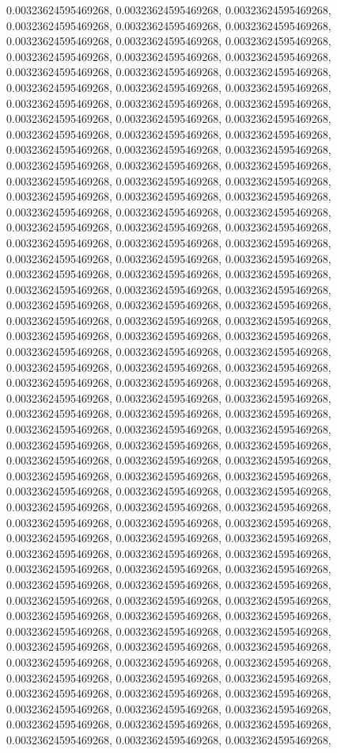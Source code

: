 \documentclass[
  ,man]{apa6}
\begin{document}
0.00323624595469268, 0.00323624595469268, 0.00323624595469268, 0.00323624595469268, 0.00323624595469268, 0.00323624595469268, 0.00323624595469268, 0.00323624595469268, 0.00323624595469268, 0.00323624595469268, 0.00323624595469268, 0.00323624595469268, 0.00323624595469268, 0.00323624595469268, 0.00323624595469268, 0.00323624595469268, 0.00323624595469268, 0.00323624595469268, 0.00323624595469268, 0.00323624595469268, 0.00323624595469268, 0.00323624595469268, 0.00323624595469268, 0.00323624595469268,
0.00323624595469268, 0.00323624595469268, 0.00323624595469268, 0.00323624595469268, 0.00323624595469268, 0.00323624595469268, 0.00323624595469268, 0.00323624595469268, 0.00323624595469268, 0.00323624595469268, 0.00323624595469268, 0.00323624595469268, 0.00323624595469268, 0.00323624595469268, 0.00323624595469268, 0.00323624595469268, 0.00323624595469268, 0.00323624595469268, 0.00323624595469268, 0.00323624595469268, 0.00323624595469268, 0.00323624595469268, 0.00323624595469268, 0.00323624595469268,
0.00323624595469268, 0.00323624595469268, 0.00323624595469268, 0.00323624595469268, 0.00323624595469268, 0.00323624595469268, 0.00323624595469268, 0.00323624595469268, 0.00323624595469268, 0.00323624595469268, 0.00323624595469268, 0.00323624595469268, 0.00323624595469268, 0.00323624595469268, 0.00323624595469268, 0.00323624595469268, 0.00323624595469268, 0.00323624595469268, 0.00323624595469268, 0.00323624595469268, 0.00323624595469268, 0.00323624595469268, 0.00323624595469268, 0.00323624595469268,
0.00323624595469268, 0.00323624595469268, 0.00323624595469268, 0.00323624595469268, 0.00323624595469268, 0.00323624595469268, 0.00323624595469268, 0.00323624595469268, 0.00323624595469268, 0.00323624595469268, 0.00323624595469268, 0.00323624595469268, 0.00323624595469268, 0.00323624595469268, 0.00323624595469268, 0.00323624595469268, 0.00323624595469268, 0.00323624595469268, 0.00323624595469268, 0.00323624595469268, 0.00323624595469268, 0.00323624595469268, 0.00323624595469268, 0.00323624595469268,
0.00323624595469268, 0.00323624595469268, 0.00323624595469268, 0.00323624595469268, 0.00323624595469268, 0.00323624595469268, 0.00323624595469268, 0.00323624595469268, 0.00323624595469268, 0.00323624595469268, 0.00323624595469268, 0.00323624595469268, 0.00323624595469268, 0.00323624595469268, 0.00323624595469268, 0.00323624595469268, 0.00323624595469268, 0.00323624595469268, 0.00323624595469268, 0.00323624595469268, 0.00323624595469268, 0.00323624595469268, 0.00323624595469268, 0.00323624595469268,
0.00323624595469268, 0.00323624595469268, 0.00323624595469268, 0.00323624595469268, 0.00323624595469268, 0.00323624595469268, 0.00323624595469268, 0.00323624595469268, 0.00323624595469268, 0.00323624595469268, 0.00323624595469268, 0.00323624595469268, 0.00323624595469268, 0.00323624595469268, 0.00323624595469268, 0.00323624595469268, 0.00323624595469268, 0.00323624595469268, 0.00323624595469268, 0.00323624595469268, 0.00323624595469268, 0.00323624595469268, 0.00323624595469268, 0.00323624595469268,
\end{document}
